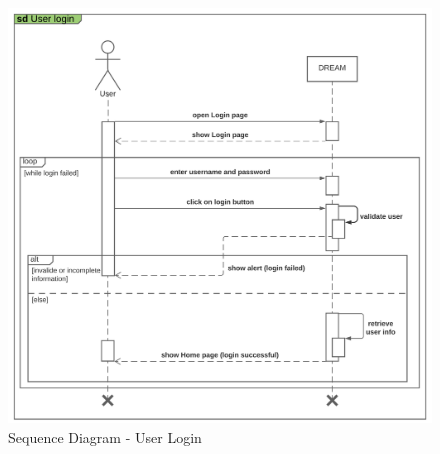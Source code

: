\begin{center}
    \begin{figure}[H]
  \includegraphics[width=\textwidth,height=\textheight,keepaspectratio]{./Images/Sequence diagram User Login.png}
       \vspace*{-0.7cm}
  \caption{Sequence Diagram - User Login}
\end{figure}
\end{center}

